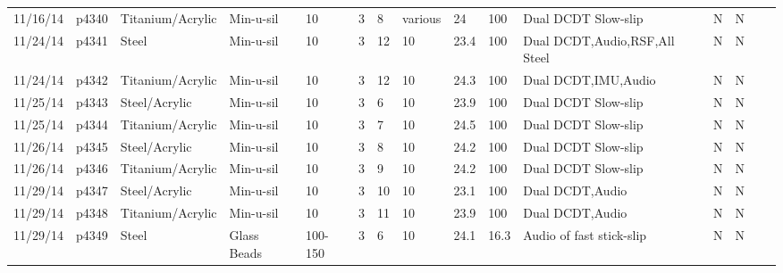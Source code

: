 \begin{landscape}
\begin{longtable}{lllllllllllllll}
11/16/14 & p4340      & Titanium/Acrylic & Min-u-sil    & 10           & 3         & 8             & various                      & 24          & 100      & Dual DCDT Slow-slip                             & N     & N    &  &  \\
11/24/14 & p4341      & Steel            & Min-u-sil    & 10           & 3         & 12            & 10                           & 23.4        & 100      & Dual DCDT,Audio,RSF,All Steel                   & N     & N    &  &  \\
11/24/14 & p4342      & Titanium/Acrylic & Min-u-sil    & 10           & 3         & 12            & 10                           & 24.3        & 100      & Dual DCDT,IMU,Audio                             & N     & N    &  &  \\
11/25/14 & p4343      & Steel/Acrylic    & Min-u-sil    & 10           & 3         & 6             & 10                           & 23.9        & 100      & Dual DCDT Slow-slip                             & N     & N    &  &  \\
11/25/14 & p4344      & Titanium/Acrylic & Min-u-sil    & 10           & 3         & 7             & 10                           & 24.5        & 100      & Dual DCDT Slow-slip                             & N     & N    &  &  \\
11/26/14 & p4345      & Steel/Acrylic    & Min-u-sil    & 10           & 3         & 8             & 10                           & 24.2        & 100      & Dual DCDT Slow-slip                             & N     & N    &  &  \\
11/26/14 & p4346      & Titanium/Acrylic & Min-u-sil    & 10           & 3         & 9             & 10                           & 24.2        & 100      & Dual DCDT Slow-slip                             & N     & N    &  &  \\
11/29/14 & p4347      & Steel/Acrylic    & Min-u-sil    & 10           & 3         & 10            & 10                           & 23.1        & 100      & Dual DCDT,Audio                                 & N     & N    &  &  \\
11/29/14 & p4348      & Titanium/Acrylic & Min-u-sil    & 10           & 3         & 11            & 10                           & 23.9        & 100      & Dual DCDT,Audio                                 & N     & N    &  &  \\
11/29/14 & p4349      & Steel            & Glass Beads  & 100-150      & 3         & 6             & 10                           & 24.1        & 16.3     & Audio of fast stick-slip                        & N     & N    &  &  \\

\end{longtable}
\end{landscape}
